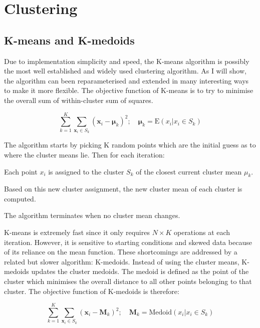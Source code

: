 \chapter{\label{appendix:clustering}Clustering}

\section{K-means and K-medoids}

Due to implementation simplicity and speed, the K-means algorithm is possibly the most well established and widely used clustering algorithm.
As I will show, the algorithm can been reparameterised and extended in many interesting ways to make it more flexible.
The objective function of K-means is to try to minimise the overall sum of within-cluster sum of squares.

\[
    \sum_{k=1}^{K} \sum_{\mathbf x_i \in S_k} ( \mathbf x_i - \boldsymbol\mu_k )^2 ; \quad \boldsymbol\mu_k=\text{E}(x_i| x_i \in S_k)
\]


The algorithm starts by picking K random points which are the initial guess as to where the cluster means lie.
Then for each iteration:
\begin{itemise}
    \item Each point $x_i$ is assigned to the cluster $S_k$ of the closest current cluster mean $\mu_k$.
    \item Based on this new cluster assignment, the new cluster mean of each cluster is computed.
\end{itemise}
The algorithm terminates when no cluster mean changes.

\vspace{1em}
\noindent

K-means is extremely fast since it only requires $N \times K$ operations at each iteration.
However, it is sensitive to starting conditions and skewed data because of its reliance on the mean function.
These shortcomings are addressed by a related but slower algorithm: K-medoids.
Instead of using the cluster means, K-medoids updates the cluster medoids.
The medoid is defined as the point of the cluster which minimises the overall distance
to all other points belonging to that cluster.
The objective function of K-medoids is therefore:

\[
    \sum_{k=1}^{K} \sum_{\mathbf x_i \in S_k} ( \mathbf x_i - \boldsymbol M_k )^2 ; \quad \boldsymbol M_k=\text{Medoid}(x_i| x_i \in S_k)
\]

